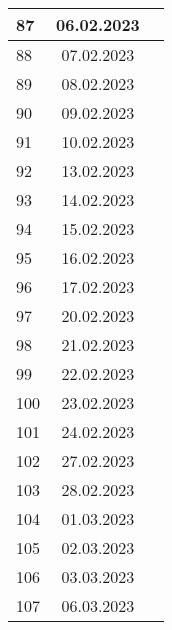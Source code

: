 \begin{longtable}{|l|c|l|}
87  & 06.02.2023    &                                                       \\ \hline 
88  & 07.02.2023    &                                                       \\ \hline 
89  & 08.02.2023    &                                                       \\ \hline 
90  & 09.02.2023    &                                                       \\ \hline 
91  & 10.02.2023    &                                                       \\ \hline 
92  & 13.02.2023    &                                                       \\ \hline 
93  & 14.02.2023    &                                                       \\ \hline 
94  & 15.02.2023    &                                                       \\ \hline 
95  & 16.02.2023    &                                                       \\ \hline 
96  & 17.02.2023    &                                                       \\ \hline 
97  & 20.02.2023    &                                                       \\ \hline 
98  & 21.02.2023    &                                                       \\ \hline 
99  & 22.02.2023    &                                                       \\ \hline 
100 & 23.02.2023    &                                                       \\ \hline 
101 & 24.02.2023    &                                                       \\ \hline 
102 & 27.02.2023    &                                                       \\ \hline 
103 & 28.02.2023    &                                                       \\ \hline 
104 & 01.03.2023    &                                                       \\ \hline 
105 & 02.03.2023    &                                                       \\ \hline 
106 & 03.03.2023    &                                                       \\ \hline 
107 & 06.03.2023    &                                                       \\ \hline

\end{longtable}
